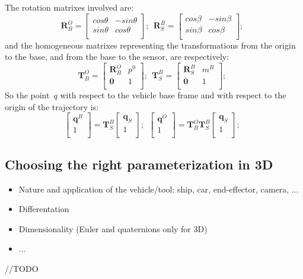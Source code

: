 The rotation matrixes involved are:
\begin{equation}
\mathbf{R}^O_B = 
\left[
 \begin{array}{cc}
    cos\theta   &  -sin\theta  \\
    sin\theta  & cos\theta \\
 \end{array}
 \right];\ \ 
\mathbf{R}^B_S = 
\left[
 \begin{array}{cc}
    cos\beta   &  -sin\beta  \\
    sin\beta  & cos\beta \\
 \end{array}
 \right];\ \ 
\end{equation}
and the homogeneous matrixes representing the transformations from the origin to the base, and from the base to the sensor, are respectively:
\begin{equation}
\mathbf{T}^O_B = 
\left[
 \begin{array}{cc}
    \mathbf{R}^O_B  &  p^0  \\
    \mathbf{0} & 1 \\
 \end{array}
 \right];\ \ 
\mathbf{T}^B_S = 
\left[
 \begin{array}{cc}
    \mathbf{R}^B_S  &  m^B  \\
    \mathbf{0} & 1 \\
 \end{array}
 \right];\ \ 
\end{equation}
So the point~$q$ with respect to the vehicle base frame and with respect to the origin of the trajectory is: 
\begin{equation}
\left[
\begin{array}{c}
    \mathbf{q}^B\\
    1 \\
 \end{array}
\right] = 
\mathbf{T}^B_S 
\left[
\begin{array}{c}
    \mathbf{q}_S\\
    1 \\
 \end{array}
\right];\ \ 
\left[
\begin{array}{c}
    \mathbf{q}^O\\
    1 \\
 \end{array}
\right] = 
\mathbf{T}^O_B \mathbf{T}^B_S 
\left[
\begin{array}{c}
    \mathbf{q}_S\\
    1 \\
 \end{array}
\right];\ \ 
\end{equation}
  

\subsection{Choosing the right parameterization in 3D}
\begin{itemize}
 \item Nature and application of the vehicle/tool: ship, car, end-effector, camera, ...
 \item Differentation
 \item Dimensionality (Euler and quaternions only for 3D)
 \item ...
\end{itemize}
//TODO
